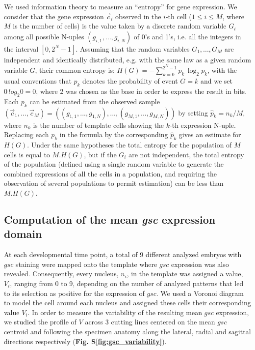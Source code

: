 We used information theory to measure an ``entropy'' for gene expression. We consider that the gene expression $\vec{c}_i$ observed in the $i$-th cell ($1 \leq i \leq M$, where $M$ is the number of cells) is the value taken by a discrete random variable $G_i$ among all possible N-uples $(g_{i,1}, ..., g_{i,N})$ of 0's and 1's, i.e. all the integers in the interval $[0,2^N-1]$. Assuming that the random variables $G_1, ..., G_M$ are independent and identically distributed, e.g. with the same law as a given random variable $G$, their common entropy is: $H(G)= - \sum_{k=0}^{2^N-1} p_{k}\,\log_{2}p_{k}$, with the usual conventions that $p_k$ denotes the probability of event $G = k$ and we set $0\,log_{2}0=0$, where 2 was chosen as the base in order to express the result in bits. Each $p_k$ can be estimated from the observed sample $(\vec{c}_1, ..., \vec{c}_M) = ((g_{1,1}, ..., g_{1,N}), ..., (g_{M,1}, ..., g_{M,N}))$ by setting $\hat{p}_k = n_k/M$, where $n_k$ is the number of template cells showing the $k$-th expression N-uple. Replacing each $p_k$ in the formula by the corresponding $\hat{p}_k$ gives an estimate for $H(G)$. Under the same hypotheses the total entropy for the population of $M$ cells is equal to $M.H(G)$, but if the $G_i$ are not independent, the total entropy of the population (defined using a single random variable to generate the combined expressions of all the cells in a population, and requiring the observation of several populations to permit estimation) can be less than $M.H(G)$.



\subsection*{Computation of the mean \emph{gsc} expression domain}

\label{sec:Mean_gsc}

At each developmental time point, a total of 9 different analyzed embryos with $gsc$ staining were mapped onto the template where $gsc$ expression was also revealed. Consequently, every nucleus, $n_i$, in the template was assigned a value, $V_i$, ranging from 0 to 9, depending on the number of analyzed patterns that led to its selection as positive for the expression of $gsc$. We used a Voronoi diagram to model the cell around each nucleus and assigned these cells their corresponding value $V_i$. In order to measure the variability of the resulting mean $gsc$ expression, we studied the profile of $V$ across 3 cutting lines centered on the mean $gsc$ centroid and following the specimen anatomy along the lateral, radial and sagittal directions respectively (\textbf{Fig. S\ref{fig:gsc_variability}}).



